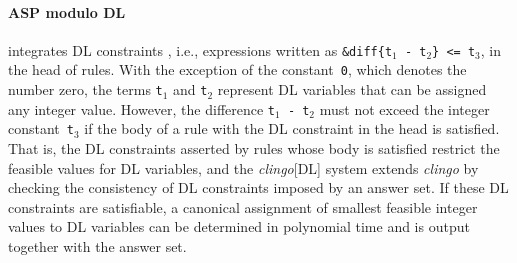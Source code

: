 \documentclass{tlp} %
\newcommand{\clingo}{\emph{clingo}\xspace}
\newcommand{\clingodl}{\emph{clingo}[DL]\xspace}
\begin{document}
\paragraph{ASP modulo DL}
integrates DL constraints \citep{cotmal06a}, i.e., expressions written as
\lstinline|&diff{t|$_1$\lstinline| - t|$_2$\lstinline|} <= t|$_3$, in the head of rules.
With the exception of the constant~\lstinline{0}, which denotes the number zero,
the terms \lstinline|t|$_1$ and \lstinline|t|$_2$ represent DL variables that can be
assigned any integer value.
However, the difference \lstinline|t|$_1$\lstinline| - t|$_2$ must not exceed the
integer constant~\lstinline|t|$_3$ if the body of a rule with the DL constraint in the
head is satisfied.
That is, the DL constraints asserted by rules whose body is satisfied restrict the
feasible values for DL variables,
and the \clingodl system extends \clingo by checking the consistency of DL constraints
imposed by an answer set.
If these DL constraints are satisfiable, a canonical assignment of smallest feasible
integer values to DL variables can be determined in polynomial time and is output
together with the answer set.
%
\end{document}
